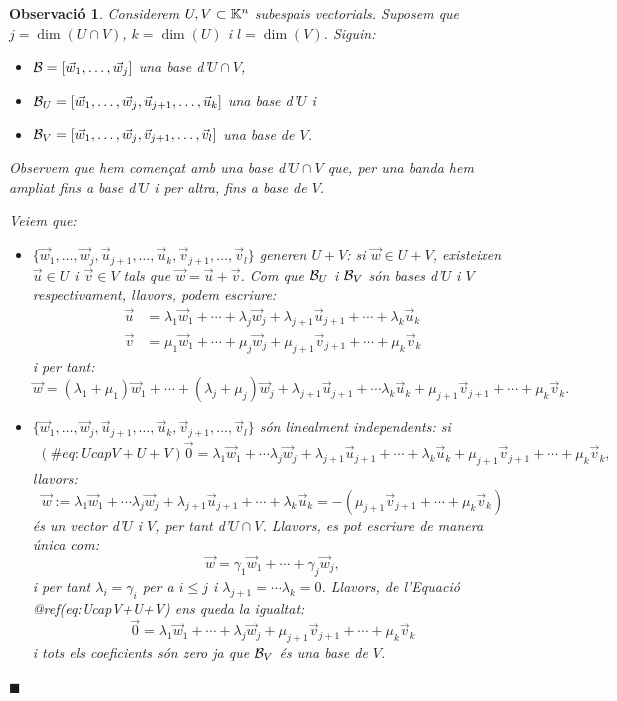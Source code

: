 \documentclass[
  11pt,
]{book}
\numberwithin{dummy}{section}
\theoremstyle{maincolornumbox}
\newtheorem{remarkT}{Observació}[chapter]
\theoremstyle{blacknumex}
\theoremstyle{blacknumbox}
\theoremstyle{maincolornum}
\newenvironment{remark}{\begin{remarkT}}{\hfill{\tiny\ensuremath{\blacksquare}}\end{remarkT}}
\newlength\esp
\begin{document}
\begin{remark}
Considerem \(U,V\subset \mathbb{K}^n\) subespais vectorials. Suposem que
\(j=\dim(U\cap V)\), \(k=\dim(U)\) i \(l=\dim(V)\). Siguin:

\begin{itemize}
\item
  \(\mathcal{B}=[\vec w_1, \dots , \vec w_j]\) una base d'\(U\cap V\),
\item
  \(\mathcal{B}_U=[\vec w_1, \dots , \vec w_j,\vec u_{j+1}, \dots, \vec u_k]\)
  una base d'\(U\) i
\item
  \(\mathcal{B}_V=[\vec w_1, \dots , \vec w_j,\vec v_{j+1}, \dots, \vec v_l]\)
  una base de \(V\).
\end{itemize}

Observem que hem començat amb una base d'\(U\cap V\) que, per una banda
hem ampliat fins a base d'\(U\) i per altra, fins a base de \(V\).

Veiem que:

\begin{itemize}
\item
  \(\{\vec w_1, \dots , \vec w_j,\vec u_{j+1}, \dots, \vec u_k,\vec v_{j+1}, \dots, \vec v_l\}\)
  generen \(U+V\): si \(\vec w \in U+V\), existeixen \(\vec u\in U\) i
  \(\vec v\in V\) tals que \(\vec w=\vec u +\vec v\). Com que \(\mathcal{B}_U\) i
  \(\mathcal{B}_V\) són bases d'\(U\) i \(V\) respectivament, llavors, podem
  escriure: \begin{align*}
              \vec u &=\lambda_1 \vec w_1 + \cdots + \lambda _j \vec w_j + \lambda_{j+1} \vec u_{j+1} + \cdots + \lambda_k \vec u_k \\
              \vec v &=\mu_1 \vec w_1 + \cdots + \mu _j \vec w_j + \mu_{j+1} \vec v_{j+1} + \cdots + \mu_k \vec v_k
  \end{align*} i per tant:
  \[\vec w=(\lambda_1+\mu_1) \vec w_1 + \cdots +(\lambda _j+\mu_j) \vec w_j + \lambda_{j+1} \vec u_{j+1} + \cdots \lambda_k \vec u_k+\mu_{j+1}\vec v_{j+1} + \cdots + \mu_k \vec v_k.\]
\item
  \(\{\vec w_1, \dots , \vec w_j,\vec u_{j+1}, \dots, \vec u_k,\vec v_{j+1}, \dots, \vec v_l\}\)
  són linealment independents: si \begin{align*}
  (\#eq:UcapV+U+V)
          \vec 0=\lambda_1 \vec w_1 + \cdots \lambda _j \vec w_j + \lambda_{j+1} \vec u_{j+1} + \cdots + \lambda_k \vec u_k+\mu_{j+1}\vec v_{j+1} + \cdots + \mu_k \vec v_k,
  \end{align*} llavors:
  \[\vec w := \lambda_1 \vec w_1 + \cdots \lambda _j \vec w_j + \lambda_{j+1} \vec u_{j+1} + \cdots +\lambda_k \vec u_k=-(\mu_{j+1}\vec v_{j+1} + \cdots + \mu_k \vec v_k)\]
  és un vector d'\(U\) i \(V\), per tant d'\(U\cap V\). Llavors, es pot
  escriure de manera única com:
  \[\vec w= \gamma_1 \vec w_1 + \cdots +\gamma _j \vec w_j,\] i per
  tant \(\lambda_i=\gamma_i\) per a \(i\leq j\) i
  \(\lambda_{j+1}=\cdots \lambda_k=0\). Llavors, de l'Equació
  @ref(eq:UcapV+U+V) ens queda la igualtat:
  \[\vec 0=\lambda_1 \vec w_1 + \cdots +\lambda _j \vec w_j +\mu_{j+1}\vec v_{j+1} + \cdots + \mu_k \vec v_k\]
  i tots els coeficients són zero ja que \(\mathcal{B}_V\) és una base de \(V\).
\end{itemize}


\end{remark}
\end{document}
